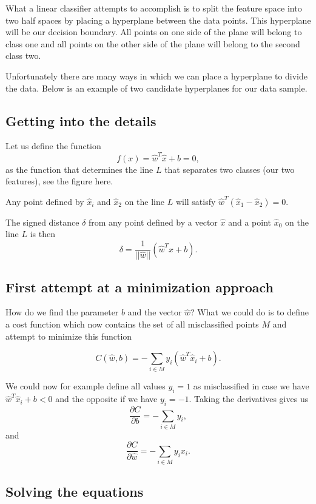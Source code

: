 \documentclass[%
oneside,                 %
final,                   %
10pt]{article}
\begin{document}
What a linear classifier attempts to accomplish is to split the
feature space into two half spaces by placing a hyperplane between the
data points.  This hyperplane will be our decision boundary.  All
points on one side of the plane will belong to class one and all points
on the other side of the plane will belong to the second class two.

Unfortunately there are many ways in which we can place a hyperplane
to divide the data.  Below is an example of two candidate hyperplanes
for our data sample.

\subsection*{Getting into the details}

Let us define the function
\[
f(x) = \hat{w}^T\hat{x}+b = 0,
\]
as the function that determines the line $L$ that separates two classes (our two features), see the figure here. 


Any point defined by $\hat{x}_i$ and $\hat{x}_2$ on the line $L$ will satisfy $\hat{w}^T(\hat{x}_1-\hat{x}_2)=0$. 

The signed distance $\delta$ from any point defined by a vector $\hat{x}$ and a point $\hat{x}_0$ on the line $L$ is then
\[
\delta = \frac{1}{\vert\vert \hat{w}\vert\vert}(\hat{w}^T\hat{x}+b).
\]

\subsection*{First attempt at a minimization approach}

How do we find the parameter $b$ and the vector $\hat{w}$? What we could
do is to define a cost function which now contains the set of all
misclassified points $M$ and attempt to minimize this function

\[
C(\hat{w},b) = -\sum_{i\in M} y_i(\hat{w}^T\hat{x}_i+b).
\]

We could now for example define all values $y_i =1$ as misclassified in case we have $\hat{w}^T\hat{x}_i+b < 0$ and the opposite if we have $y_i=-1$. Taking the derivatives gives us
\[
\frac{\partial C}{\partial b} = -\sum_{i\in M} y_i,
\]
and 
\[
\frac{\partial C}{\partial \hat{w}} = -\sum_{i\in M} y_ix_i.
\]

\subsection*{Solving the equations}
\end{document}
